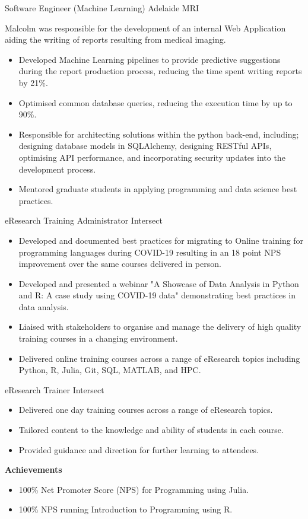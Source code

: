 {Software Engineer (Machine Learning)}
{Adelaide MRI}{}{}
{%
  Malcolm was responsible for the development of an internal Web Application
  aiding the writing of reports resulting from medical imaging.
  \begin{itemize}
    \item Developed Machine Learning pipelines to provide predictive
      suggestions during the report production process, reducing the time spent
      writing reports by 21\%.
    \item Optimised common database queries, reducing the execution time by
      up to 90\%.
    \item Responsible for architecting solutions
      within the python back-end, including;
      designing database models in SQLAlchemy,
      designing RESTful APIs,
      optimising API performance,
      and incorporating security updates into the development process.
    \item Mentored graduate students in applying programming and data science
      best practices.
  \end{itemize}
}

{eResearch Training Administrator}
{Intersect}{}{}
{%
  \begin{itemize}
    \item Developed and documented best practices for migrating to Online
      training for programming languages during COVID-19 resulting in an
      18 point NPS improvement over the same courses delivered in person.
    \item Developed and presented a webinar
      {"A Showcase of Data Analysis in Python and R: A case study using COVID-19 data"}
      demonstrating best practices in data analysis.
    \item Liaised with stakeholders to organise and manage the delivery of high
      quality training courses in a changing environment.
    \item Delivered online training courses across a range of eResearch topics
      including Python, R, Julia, Git, SQL, MATLAB, and HPC.
  \end{itemize}
}

{eResearch Trainer}
{Intersect}{}{}
{%
  \begin{itemize}
    \item Delivered one day training courses across a range of eResearch topics.
    \item Tailored content to the knowledge and ability of students in each
      course.
    \item Provided guidance and direction for further learning to attendees.
  \end{itemize}
  \textbf{Achievements}
  \begin{itemize}
    \item 100\% Net Promoter Score (NPS) for Programming using Julia.
    \item 100\% NPS running Introduction to Programming using R.
  \end{itemize}
}

